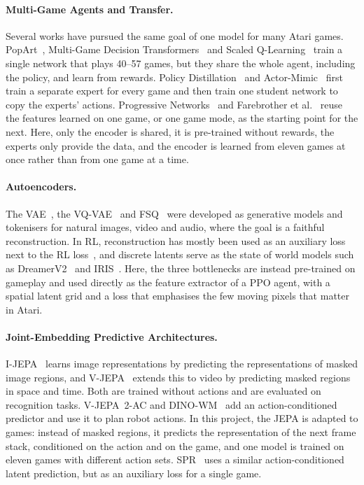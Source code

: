\documentclass[runningheads,a4paper]{llncs}
\begin{document}
\paragraph{Multi-Game Agents and Transfer.} Several works have pursued the same goal of one
model for many Atari games. PopArt~\cite{hessel2019popart}, Multi-Game Decision
Transformers~\cite{lee2022multigame} and Scaled Q-Learning~\cite{kumar2023scaledql} train a single
network that plays 40--57 games, but they share the whole agent, including the policy, and learn
from rewards. Policy Distillation~\cite{rusu2016distillation} and
Actor-Mimic~\cite{parisotto2016actormimic} first train a separate expert for every game and then
train one student network to copy the experts' actions. Progressive
Networks~\cite{rusu2016progressive} and Farebrother et al.~\cite{farebrother2018generalization}
reuse the features learned on one game, or one game mode, as the starting point for the next.
Here, only the encoder is shared, it is pre-trained without rewards, the experts only provide
the data, and the encoder is learned from eleven games at once rather than from one game at a
time.

\paragraph{Autoencoders.} The VAE~\cite{kingma2014vae}, the VQ-VAE~\cite{vandenoord2017vqvae} and
FSQ~\cite{mentzer2024fsq} were developed as generative models and tokenisers for natural images,
video and audio, where the goal is a faithful reconstruction. In RL, reconstruction has mostly been
used as an auxiliary loss next to the RL loss~\cite{yarats2021sac_ae}, and discrete latents serve
as the state of world models such as DreamerV2~\cite{hafner2021dreamerv2} and
IRIS~\cite{micheli2023iris}. Here, the three bottlenecks are instead pre-trained on gameplay and
used directly as the feature extractor of a PPO agent, with a spatial latent grid and a loss that
emphasises the few moving pixels that matter in Atari.

\paragraph{Joint-Embedding Predictive Architectures.} I-JEPA~\cite{assran2023ijepa} learns image
representations by predicting the representations of masked image regions, and
V-JEPA~\cite{bardes2024vjepa} extends this to video by predicting masked regions in space and time.
Both are trained without actions and are evaluated on recognition tasks. V-JEPA~2-AC and
DINO-WM~\cite{assran2025vjepa2,zhou2024dinowm} add an action-conditioned predictor and use it to
plan robot actions. In this project, the JEPA is adapted to games: instead of masked regions, it
predicts the representation of the next frame stack, conditioned on the action and on the game,
and one model is trained on eleven games with different action sets. SPR~\cite{schwarzer2021spr}
uses a similar action-conditioned latent prediction, but as an auxiliary loss for a single game.
\end{document}
